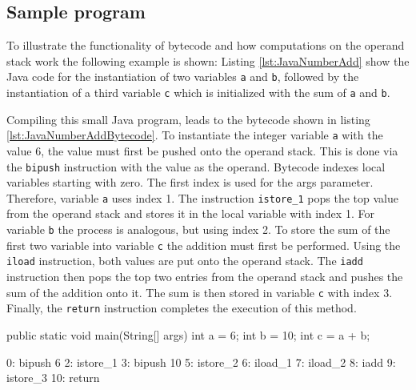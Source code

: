 \subsection{Sample program}

To illustrate the functionality of bytecode and how computations on the operand stack work the following example is shown: Listing \ref{lst:JavaNumberAdd} show the Java code for the instantiation of two variables \texttt{a} and \texttt{b},  followed by the instantiation of a third variable \texttt{c} which is initialized with the sum of \texttt{a} and \texttt{b}.

Compiling this small Java program, leads to the bytecode shown in listing \ref{lst:JavaNumberAddBytecode}. To instantiate the integer variable \texttt{a} with the value 6, the value must first be pushed onto the operand stack. This is done via the \texttt{bipush} instruction with the value as the operand. Bytecode indexes local variables starting with zero. The first index is used for the args parameter. Therefore, variable \texttt{a} uses index 1. The instruction \verb|istore_1| pops the top value from the operand stack and stores it in the local variable with index 1. For variable \texttt{b} the process is analogous, but using index 2. To store the sum of the first two variable into variable \verb|c| the addition must first be performed. Using the \verb|iload| instruction, both values are put onto the operand stack. The \verb|iadd| instruction then pops the top two entries from the operand stack and pushes the sum of the addition onto it. The sum is then stored in variable \verb|c| with index 3. Finally, the \texttt{return} instruction completes the execution of this method.  

\begin{JavaCode}[float,numbers=none,caption=Instantiation of two variables and a third one with the sum of the first two variables in Java., label=lst:JavaNumberAdd]
public static void main(String[] args) {
    int a = 6;
    int b = 10;
    int c = a + b;
}
\end{JavaCode}

\begin{Bytecode}[float,numbers=none,caption=Bytecode of the Java program shown in listing \ref{lst:JavaNumberAdd}., label=lst:JavaNumberAddBytecode]
    0: bipush        6
    2: istore_1
    3: bipush        10
    5: istore_2
    6: iload_1
    7: iload_2
    8: iadd
    9: istore_3
   10: return
\end{Bytecode}

